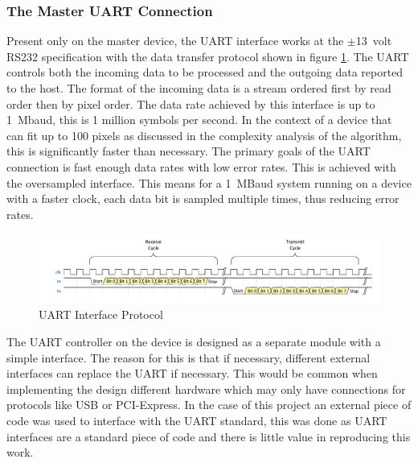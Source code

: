 \subsubsection{The Master UART Connection}
Present only on the master device, the UART interface works at the $\pm$13~volt RS232 specification with the data transfer protocol shown in figure \ref{fig:UART}. The UART controls both the incoming data to be processed and the outgoing data reported to the host. The format of the incoming data is a stream ordered first by read order then by pixel order. The data rate achieved by this interface is up to 1~Mbaud, this is 1 million symbols per second. In the context of  a device that can fit up to 100 pixels as discussed in the complexity analysis of the algorithm, this is significantly faster than necessary. The primary goals of the UART connection is fast enough data rates with low error rates. This is achieved with the oversampled interface. This means for a 1~MBaud system running on  a device with a faster clock, each data bit is sampled multiple times, thus reducing error rates. 
\begin{figure}[!h]
  \centering
  \includegraphics[width=\textwidth]{./figs/UART.pdf}
  \caption{UART Interface Protocol}
  \label{fig:UART}
\end{figure}


The UART controller on the device is designed as a separate module with a simple interface. The reason for this is that if necessary, different external interfaces can replace the UART if necessary. This would be common when implementing the design different hardware which may only have connections for protocols like USB or PCI-Express. In the case of this project an external piece of code was used to interface with the UART standard, this was done as UART interfaces are a standard piece of code and there is little value in reproducing this work.



